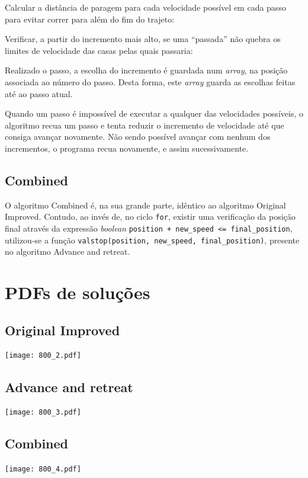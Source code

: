 \documentclass[portuguese,11pt,a4paper,titlepage]{article}
\newcommand{\extrang}[1]{\textit{#1}}
\newcommand{\srcdir}{..}
\begin{document}
Calcular a distância de paragem para cada velocidade possível em cada passo para evitar correr para além do fim do
trajeto:


Verificar, a partir do incremento mais alto, se uma ``passada'' não  quebra
os limites de velocidade das casas pelas quais passaria:


Realizado o passo, a escolha do incremento é guardada num \extrang{array},
na posição associada ao número do passo. Desta forma, este \extrang{array}
guarda as escolhas feitas até ao passo atual.

Quando um passo é impossível de executar a qualquer das velocidades possíveis,
o algoritmo recua um passo e tenta reduzir o incremento de velocidade até que
consiga avançar novamente. Não sendo possível avançar com nenhum dos incrementos,
o programa recua novamente, e assim sucessivamente.

\subsection{Combined}
O algoritmo Combined é, na sua grande parte, idêntico ao algoritmo Original Improved.
Contudo, ao invés de, no ciclo \verb#for#, existir uma verificação da posição final através da expressão \extrang{boolean}
\verb#position + new_speed <= final_position#,
utilizou-se a função \verb#valstop(position, new_speed, final_position)#, presente no algoritmo Advance and retreat.

\pagebreak

\section{PDFs de soluções}
\subsection{Original Improved}
\texttt{[image: 800\_2.pdf]}
\subsection{Advance and retreat}
\texttt{[image: 800\_3.pdf]}
\subsection{Combined}
\texttt{[image: 800\_4.pdf]}
\pagebreak
\end{document}
